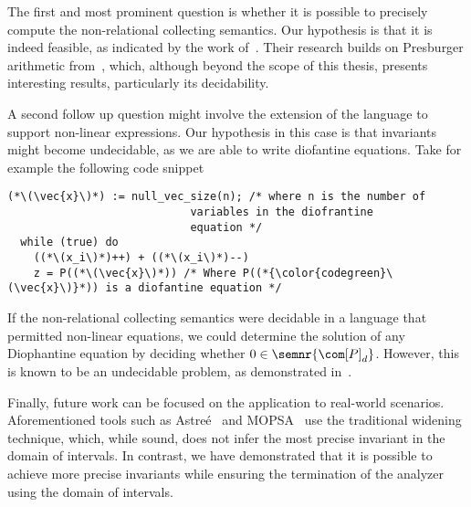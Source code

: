 The first and most prominent question is whether it is possible to
precisely compute the non-relational collecting semantics. Our
hypothesis is that it is indeed feasible, as indicated by the work
of~\cite{Lefaucheux2024}. Their research builds on Presburger
arithmetic from~\cite{1571698599431503232}, which, although beyond the
scope of this thesis, presents interesting results, particularly its
decidability.

A second follow up question might involve the extension of the
language to support non-linear expressions. Our hypothesis in this
case is that invariants might become undecidable, as we are able to
write diofantine equations. Take for example the following code
snippet
\begin{lstlisting}[language=Imp, caption=Program with diofantine equations, label=code5]
  (*\(\vec{x}\)*) := null_vec_size(n); /* where n is the number of
                            variables in the diofrantine
                            equation */
  while (true) do
    ((*\(x_i\)*)++) + ((*\(x_i\)*)--)
    z = P((*\(\vec{x}\)*)) /* Where P((*{\color{codegreen}\(\vec{x}\)}*)) is a diofantine equation */
\end{lstlisting}
If the non-relational collecting semantics were decidable in a
language that permitted non-linear equations, we could determine the
solution of any Diophantine equation by deciding whether
\(0 \in \semnr{{\com[P]}_d}\). However, this is known to be an
undecidable problem, as demonstrated in~\cite{zbMATH03336816}.

Finally, future work can be focused on the application to real-world
scenarios. Aforementioned tools such as
Astreé~\cite{10.1007/978-3-540-31987-0_3} and
MOPSA~\cite{10.1007/978-3-031-30820-8_37} use the traditional widening
technique, which, while sound, does not infer the most precise
invariant in the domain of intervals. In contrast, we have
demonstrated that it is possible to achieve more precise invariants
while ensuring the termination of the analyzer using the domain of
intervals.
